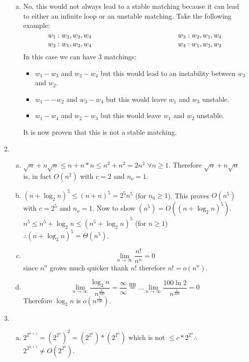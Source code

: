 \begin{enumerate}[1.]
\begin{enumerate}[(a)]
	\item No, this would not always lead to a stable matching because it can lead to either an infinite loop or an unstable matching. Take the following example: 
	$$w_1:w_3, w_2, w_4 \hspace {1.75in}w_3: w_2, w_1, w_4$$
	$$w_2: w_1, w_3, w_4 \hspace{1.75in} w_4: w_1, w_3, w_2$$
	In this case we can have 3 matchings: 
	\begin{itemize}
		\item$w_1 - w_3$ and $w_2-w_4$ but this would lead to an instability between $w_3$ and $w_2$.
		\item $w_1--w_2$ and $w_3-w_4$ but this would leave $w_1$ and $w_3$ unstable.
		\item $w_1-w_4$ and $w_2-w_3$ but this would leave $w_1$ and $w_2$ unstable. 
	\end{itemize}
	It is now proven that this is not a stable matching. 
	\end{enumerate}
	
\item \begin{enumerate}[(a)]
	\item $\sqrt{n}+n\sqrt{n} \leq n+n*n \leq n^2+n^2 = 2n^2$ $\forall n \geq 1$. Therefore $\sqrt{n}+n\sqrt{n}$ is, in fact $O(n^2)$ with $c=2$ and $n_o= 1$.
	\item ${(n+ \log_{2}n)}^5 \leq {(n+n)}^5 =2^5n^5$ (for $n_0 \geq 1$). This proves $O(n^5)$ with $c=2^5$ and $n_o=1$. Now to show $(n^5)=O({(n+\log_2n)}^5)$. $n^5 \leq n^5+\log_2n \leq (n^5+\log_2n)^5$ (for $n\geq 1$) $\therefore (n+\log_2n)^5= \Theta(n^5)$.
		
	\item $$\lim_{n\to\infty}\frac{n!}{n^n}=0$$ since $n^n$ grows much quicker thank $n!$ therefore $n!=o(n^n)$.
	\item $$\lim_{n\to\infty}\frac{\log_{2}n}{n^{\frac{1}{100}}}=\frac{\infty}{\infty}\overset{\mathrm{HR}}{=}\ldots\lim_{n\to\infty}\frac{100\ln2}{n^{\frac{1}{100}}}=0$$ Therefore $\log_2n$ is $o(n^{\frac{1}{100}})$.
	
	\end{enumerate}

\item\begin{enumerate}[(a)]
	
	\item $2^{2^{n+1}} = {(2^{2^{n}})}^2 ={(2^{2^{n}})}*{(2^{2^{n}})}$ which is not $\leq c*2^{2^{n}} \therefore$ $2^{2^{n+1}} \ne O(2^{2^n})$.
	

\end{enumerate}
\end{enumerate}
